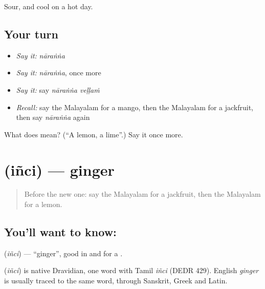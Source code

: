 \begin{grammarlens}[title={What you've built}]
Sour, and cool on a hot day.
\end{grammarlens}

\subsection*{Your turn}
\begin{itemize}
\raggedright
  \item \emph{Say it:} \emph{nāraṅṅa}
  \item \emph{Say it:} \emph{nāraṅṅa}, once more
  \item \emph{Say it:} say \emph{nāraṅṅa veḷḷaṁ}
  \item \emph{Recall:} say the Malayalam for a mango, then the Malayalam for a jackfruit, then say \emph{nāraṅṅa} again
\end{itemize}

\begin{tcolorbox}[breakable,colback=teal!4,colframe=teal!35!black,title={Before you move on}]
What does  mean? (\textquotedblleft{}A lemon, a lime\textquotedblright{}.) Say it once more.
\end{tcolorbox}
\section[\texorpdfstring{\ml{ഇഞ്ചി} (iñci)}{ഇഞ്ചി (iñci)}]{ (iñci) — ginger}

\label{lesson:ML-C133-ginger}



\begin{quote}
Before the new one: say the Malayalam for a jackfruit, then the Malayalam for a lemon.
\end{quote}

\subsection*{You'll want to know: }
\textbf{} (\emph{iñci}) — \textquotedblleft{}ginger\textquotedblright{}, good in \textbf{} and for a \textbf{}.

\begin{cousinweb}
\textbf{} (\emph{iñci}) is native Dravidian, one word with Tamil \emph{iñci} (DEDR 429). English \emph{ginger} is usually traced to the same word, through Sanskrit, Greek and Latin.
\end{cousinweb}

